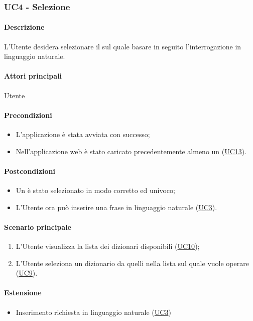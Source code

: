 \subsubsection{UC4 - Selezione }\label{UC4}
\paragraph*{Descrizione}
L’Utente desidera selezionare il  sul quale basare in seguito l’interrogazione in linguaggio naturale.

\paragraph*{Attori principali}
Utente

\paragraph*{Precondizioni}
\begin{itemize}
  \item L'applicazione è stata avviata con successo;
  \item Nell'applicazione web è stato caricato precedentemente almeno un  (\hyperref[UC13]{UC13}).
\end{itemize}

\paragraph*{Postcondizioni}
\begin{itemize}
  \item Un  è stato selezionato in modo corretto ed univoco;
  \item L’Utente ora può inserire una frase in linguaggio naturale (\hyperref[UC3]{UC3}).
\end{itemize}

\paragraph*{Scenario principale}
\begin{enumerate}
  \item L’Utente visualizza la lista dei dizionari disponibili (\hyperref[UC10]{UC10});
  \item L’Utente seleziona un dizionario da quelli nella lista sul quale vuole operare (\hyperref[UC9]{UC9}).
\end{enumerate}

\paragraph*{Estensione}
\begin{itemize}
  \item Inserimento richiesta in linguaggio naturale (\hyperref[UC3]{UC3})
\end{itemize}
